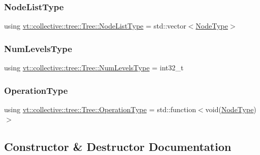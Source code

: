 \subsubsection{\texorpdfstring{Node\+List\+Type}{NodeListType}}
{\footnotesize\ttfamily using \hyperlink{structvt_1_1collective_1_1tree_1_1_tree_a834e7b54ea2dceae42db7c5ea859753f}{vt\+::collective\+::tree\+::\+Tree\+::\+Node\+List\+Type} =  std\+::vector$<$\hyperlink{namespacevt_a866da9d0efc19c0a1ce79e9e492f47e2}{Node\+Type}$>$}

\mbox{\label{structvt_1_1collective_1_1tree_1_1_tree_af64acc9543dc1bd1b56d6ed17b003425}} 
\subsubsection{\texorpdfstring{Num\+Levels\+Type}{NumLevelsType}}
{\footnotesize\ttfamily using \hyperlink{structvt_1_1collective_1_1tree_1_1_tree_af64acc9543dc1bd1b56d6ed17b003425}{vt\+::collective\+::tree\+::\+Tree\+::\+Num\+Levels\+Type} =  int32\+\_\+t}

\mbox{\label{structvt_1_1collective_1_1tree_1_1_tree_a5ce4242e9580c807baa74168401f381a}} 
\subsubsection{\texorpdfstring{Operation\+Type}{OperationType}}
{\footnotesize\ttfamily using \hyperlink{structvt_1_1collective_1_1tree_1_1_tree_a5ce4242e9580c807baa74168401f381a}{vt\+::collective\+::tree\+::\+Tree\+::\+Operation\+Type} =  std\+::function$<$void(\hyperlink{namespacevt_a866da9d0efc19c0a1ce79e9e492f47e2}{Node\+Type})$>$}



\subsection{Constructor \& Destructor Documentation}
\mbox{\label{structvt_1_1collective_1_1tree_1_1_tree_ae9570e9a8f303295744e99b527603a51}} 
